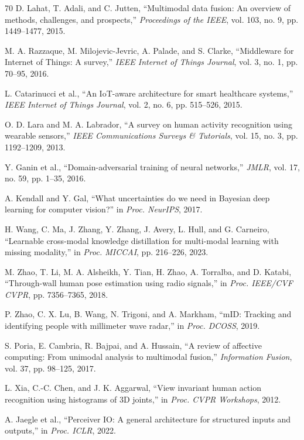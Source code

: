 \documentclass[journal]{IEEEtran}
\begin{document}
\begin{thebibliography}{70}
D. Lahat, T. Adali, and C. Jutten, ``Multimodal data fusion: An overview of methods, challenges, and prospects,'' \emph{Proceedings of the IEEE}, vol. 103, no. 9, pp. 1449--1477, 2015.

M. A. Razzaque, M. Milojevic-Jevric, A. Palade, and S. Clarke, ``Middleware for Internet of Things: A survey,'' \emph{IEEE Internet of Things Journal}, vol. 3, no. 1, pp. 70--95, 2016.

L. Catarinucci et al., ``An IoT-aware architecture for smart healthcare systems,'' \emph{IEEE Internet of Things Journal}, vol. 2, no. 6, pp. 515--526, 2015.

O. D. Lara and M. A. Labrador, ``A survey on human activity recognition using wearable sensors,'' \emph{IEEE Communications Surveys \& Tutorials}, vol. 15, no. 3, pp. 1192--1209, 2013.

Y. Ganin et al., ``Domain-adversarial training of neural networks,'' \emph{JMLR}, vol. 17, no. 59, pp. 1--35, 2016.

A. Kendall and Y. Gal, ``What uncertainties do we need in Bayesian deep learning for computer vision?'' in \emph{Proc. NeurIPS}, 2017.

H. Wang, C. Ma, J. Zhang, Y. Zhang, J. Avery, L. Hull, and G. Carneiro, ``Learnable cross-modal knowledge distillation for multi-modal learning with missing modality,'' in \emph{Proc. MICCAI}, pp. 216--226, 2023.

M. Zhao, T. Li, M. A. Alsheikh, Y. Tian, H. Zhao, A. Torralba, and D. Katabi, ``Through-wall human pose estimation using radio signals,'' in \emph{Proc. IEEE/CVF CVPR}, pp. 7356--7365, 2018.

P. Zhao, C. X. Lu, B. Wang, N. Trigoni, and A. Markham, ``mID: Tracking and identifying people with millimeter wave radar,'' in \emph{Proc. DCOSS}, 2019.

S. Poria, E. Cambria, R. Bajpai, and A. Hussain, ``A review of affective computing: From unimodal analysis to multimodal fusion,'' \emph{Information Fusion}, vol. 37, pp. 98--125, 2017.

L. Xia, C.-C. Chen, and J. K. Aggarwal, ``View invariant human action recognition using histograms of 3D joints,'' in \emph{Proc. CVPR Workshops}, 2012.

A. Jaegle et al., ``Perceiver IO: A general architecture for structured inputs and outputs,'' in \emph{Proc. ICLR}, 2022.


\end{thebibliography}
\end{document}
